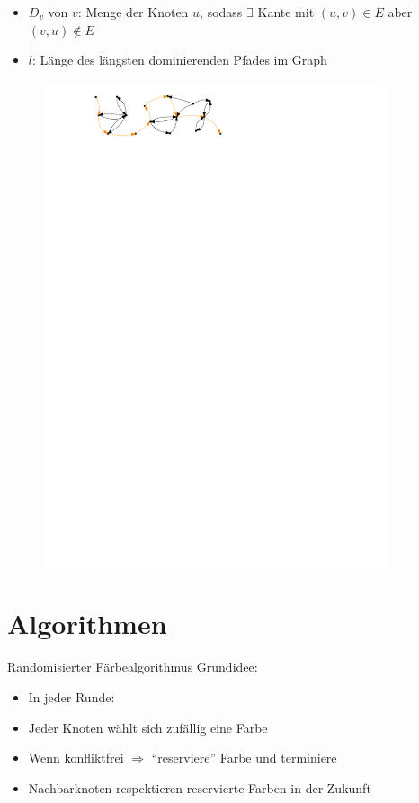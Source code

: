 \documentclass[18pt]{beamer}
\begin{document}
\begin{frame}
\begin{itemize}
		\item $D_v$ von $v$: Menge der Knoten $u$, sodass $\exists$ Kante mit $(u,v)\in E$ aber $(v,u)\notin E$
		\item $l$: Länge des längsten dominierenden Pfades im Graph
\end{itemize}
\begin{figure}
	\centering
		\includegraphics[width=0.90\textwidth,clip=true,trim=2cm 0pt 0pt 0pt]{pdf/longestpath.pdf}
	\label{fig:longestpath}
\end{figure}

\end{frame}


\section{Algorithmen}

\begin{frame}{Randomisierter Färbealgorithmus}
Grundidee:
\begin{itemize}[<+->]
	\item In jeder Runde:
	\item Jeder Knoten wählt sich zufällig eine Farbe
	\item Wenn konfliktfrei $\Rightarrow$ "`reserviere"' Farbe und terminiere
	\item Nachbarknoten respektieren reservierte Farben in der Zukunft
\end{itemize}
\end{frame}
\end{document}
